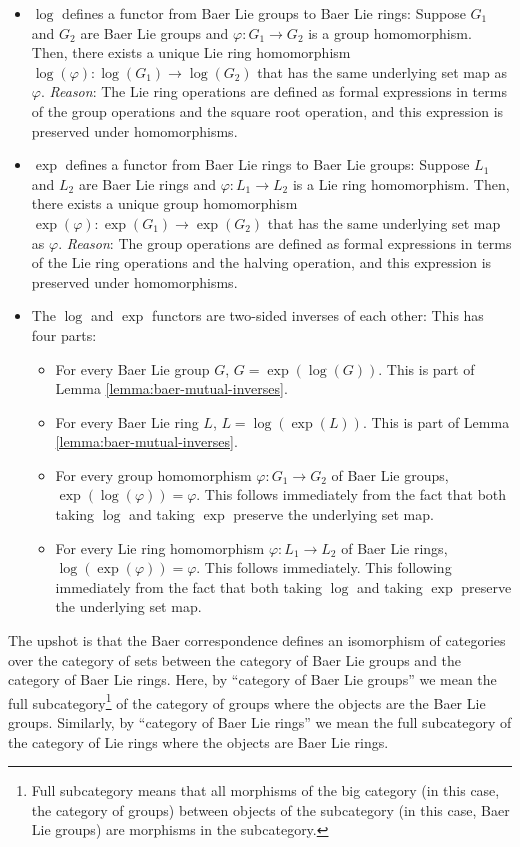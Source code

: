 \documentclass{ucetd}
\begin{document}
\begin{itemize}
\item $\log$ defines a functor from Baer Lie groups to Baer Lie rings:
  Suppose $G_1$ and $G_2$ are Baer Lie groups and $\varphi:G_1 \to
  G_2$ is a group homomorphism. Then, there exists a unique Lie ring
  homomorphism $\log(\varphi): \log(G_1) \to \log(G_2)$ that has the
  same underlying set map as $\varphi$. {\em Reason}: The Lie ring
  operations are defined as formal expressions in terms of the group
  operations and the square root operation, and this expression is
  preserved under homomorphisms.
\item $\exp$ defines a functor from Baer Lie rings to Baer Lie groups:
  Suppose $L_1$ and $L_2$ are Baer Lie rings and $\varphi:L_1 \to L_2$
  is a Lie ring homomorphism. Then, there exists a unique group
  homomorphism $\exp(\varphi): \exp(G_1) \to \exp(G_2)$ that has the
  same underlying set map as $\varphi$. {\em Reason}: The group
  operations are defined as formal expressions in terms of the Lie
  ring operations and the halving operation, and this expression is
  preserved under homomorphisms.
\item The $\log$ and $\exp$ functors are two-sided inverses of each
  other: This has four parts:
  \begin{itemize}
    \item For every Baer Lie group $G$, $G = \exp(\log(G))$. This is
      part of Lemma \ref{lemma:baer-mutual-inverses}.
    \item For every Baer Lie ring $L$, $L = \log(\exp(L))$. This is
      part of Lemma \ref{lemma:baer-mutual-inverses}.
    \item For every group homomorphism $\varphi:G_1 \to G_2$ of Baer
      Lie groups, $\exp(\log(\varphi)) = \varphi$. This follows
      immediately from the fact that both taking $\log$ and taking
      $\exp$ preserve the underlying set map.
    \item For every Lie ring homomorphism $\varphi:L_1 \to L_2$ of
      Baer Lie rings, $\log(\exp(\varphi)) = \varphi$. This follows
      immediately. This following immediately from the fact that both
      taking $\log$ and taking $\exp$ preserve the underlying set map.
  \end{itemize}
\end{itemize}

The upshot is that the Baer correspondence defines an isomorphism of
categories over the category of sets between the category of Baer Lie
groups and the category of Baer Lie rings. Here, by ``category of Baer
Lie groups'' we mean the full subcategory\footnote{Full subcategory
  means that all morphisms of the big category (in this case, the
  category of groups) between objects of the subcategory (in this
  case, Baer Lie groups) are morphisms in the subcategory.} of the
category of groups where the objects are the Baer Lie
groups. Similarly, by ``category of Baer Lie rings'' we mean the full
subcategory of the category of Lie rings where the objects are Baer
Lie rings.
\end{document}
